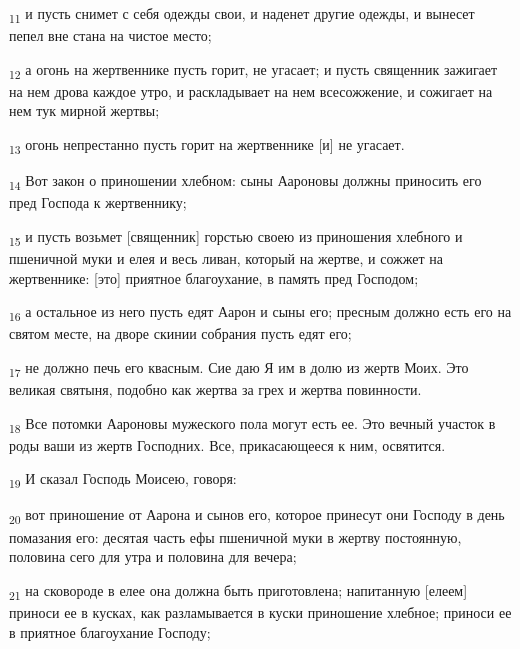 \begin{tcolorbox}
\textsubscript{11} и пусть снимет с себя одежды свои, и наденет другие одежды, и вынесет пепел вне стана на чистое место;
\end{tcolorbox}
\begin{tcolorbox}
\textsubscript{12} а огонь на жертвеннике пусть горит, не угасает; и пусть священник зажигает на нем дрова каждое утро, и раскладывает на нем всесожжение, и сожигает на нем тук мирной жертвы;
\end{tcolorbox}
\begin{tcolorbox}
\textsubscript{13} огонь непрестанно пусть горит на жертвеннике [и] не угасает.
\end{tcolorbox}
\begin{tcolorbox}
\textsubscript{14} Вот закон о приношении хлебном: сыны Аароновы должны приносить его пред Господа к жертвеннику;
\end{tcolorbox}
\begin{tcolorbox}
\textsubscript{15} и пусть возьмет [священник] горстью своею из приношения хлебного и пшеничной муки и елея и весь ливан, который на жертве, и сожжет на жертвеннике: [это] приятное благоухание, в память пред Господом;
\end{tcolorbox}
\begin{tcolorbox}
\textsubscript{16} а остальное из него пусть едят Аарон и сыны его; пресным должно есть его на святом месте, на дворе скинии собрания пусть едят его;
\end{tcolorbox}
\begin{tcolorbox}
\textsubscript{17} не должно печь его квасным. Сие даю Я им в долю из жертв Моих. Это великая святыня, подобно как жертва за грех и жертва повинности.
\end{tcolorbox}
\begin{tcolorbox}
\textsubscript{18} Все потомки Аароновы мужеского пола могут есть ее. Это вечный участок в роды ваши из жертв Господних. Все, прикасающееся к ним, освятится.
\end{tcolorbox}
\begin{tcolorbox}
\textsubscript{19} И сказал Господь Моисею, говоря:
\end{tcolorbox}
\begin{tcolorbox}
\textsubscript{20} вот приношение от Аарона и сынов его, которое принесут они Господу в день помазания его: десятая часть ефы пшеничной муки в жертву постоянную, половина сего для утра и половина для вечера;
\end{tcolorbox}
\begin{tcolorbox}
\textsubscript{21} на сковороде в елее она должна быть приготовлена; напитанную [елеем] приноси ее в кусках, как разламывается в куски приношение хлебное; приноси ее в приятное благоухание Господу;
\end{tcolorbox}
